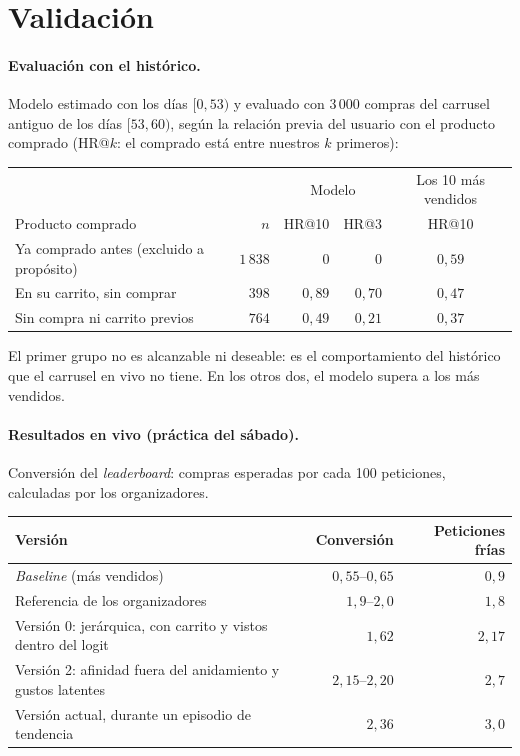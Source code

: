 \documentclass[11pt,a4paper]{article}
\begin{document}
\section{Validación}

\paragraph{Evaluación con el histórico.} Modelo estimado con los días $[0,53)$ y evaluado con $3\,000$
compras del carrusel antiguo de los días $[53,60)$, según la relación previa del usuario con el
producto comprado (HR@$k$: el comprado está entre nuestros $k$ primeros):

\begin{center}
\small
\begin{tabular}{lrrrc}
\toprule
 & & \multicolumn{2}{c}{Modelo} & Los 10 más vendidos\\
Producto comprado & $n$ & HR@10 & HR@3 & HR@10\\
\midrule
Ya comprado antes (excluido a propósito) & $1\,838$ & $0$ & $0$ & $0{,}59$\\
En su carrito, sin comprar & $398$ & $0{,}89$ & $0{,}70$ & $0{,}47$\\
Sin compra ni carrito previos & $764$ & $0{,}49$ & $0{,}21$ & $0{,}37$\\
\bottomrule
\end{tabular}
\end{center}

El primer grupo no es alcanzable ni deseable: es el comportamiento del histórico que el carrusel en
vivo no tiene. En los otros dos, el modelo supera a los más vendidos.

\paragraph{Resultados en vivo (práctica del sábado).} Conversión del \emph{leaderboard}: compras
esperadas por cada 100 peticiones, calculadas por los organizadores.

\begin{center}
\small
\begin{tabular}{p{8.6cm}rr}
\toprule
Versión & Conversión & Peticiones frías\\
\midrule
\emph{Baseline} (más vendidos) & $0{,}55$--$0{,}65$ & $0{,}9$\\
Referencia de los organizadores & $1{,}9$--$2{,}0$ & $1{,}8$\\
Versión 0: jerárquica, con carrito y vistos dentro del logit & $1{,}62$ & $2{,}17$\\
Versión 2: afinidad fuera del anidamiento y gustos latentes & $2{,}15$--$2{,}20$ & $2{,}7$\\
Versión actual, durante un episodio de tendencia & $2{,}36$ & $3{,}0$\\
\bottomrule
\end{tabular}
\end{center}
\end{document}
